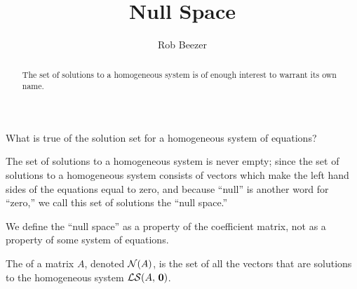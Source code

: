 \documentclass{ximera}
\author{Rob Beezer}
\title{Null Space}
\begin{document}
\begin{abstract}
  The set of solutions to a homogeneous system is of enough interest to warrant its own name.  
\end{abstract}
\maketitle

\begin{question}
  What is true of the solution set for a homogeneous system of
  equations?

  \begin{multipleChoice}
  \end{multipleChoice}

  \begin{feedback}[correct]
    The set of solutions to a homogeneous system is never empty; since
    the set of solutions to a homogeneous system consists of vectors
    which make the left hand sides of the equations equal to zero, and
    because ``null'' is another word for ``zero,'' we call this set of
    solutions the ``null space.''
  \end{feedback}
\end{question}

We define the ``null space'' as a property of the coefficient matrix,
not as a property of some system of equations.

\begin{definition}
  The  of a matrix $A$, denoted $\mathcal{N}\!\left(A\right)$, is the set
  of all the vectors that are solutions to the homogeneous system
  $\mathcal{LS}\!\left(A,\,\mathbf{0}\right)$.
\end{definition}
\end{document}
